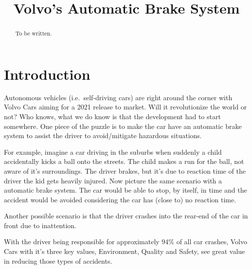 \documentclass[conference]{IEEEtran}
\begin{document}
\title{Volvo's Automatic Brake System}

\author{
\and
{}
}

\maketitle

\begin{abstract}
To be written.
\end{abstract}

\section{Introduction}
Autonomous vehicles (i.e.\ self-driving cars) are right around the corner with Volvo Cars aiming for a 2021 release to market.\cite{ADToMarket} Will it revolutionize the world or not? Who knows, what we do know is that the development had to start somewhere. One piece of the puzzle is to make the car have an automatic brake system to assist the driver to avoid/mitigate hazardous situations. 

For example, imagine a car driving in the suburbs when suddenly a child accidentally kicks a ball onto the streets. The child makes a run for the ball, not aware of it's surroundings. The driver brakes, but it's due to reaction time of the driver the kid gets heavily injured. Now picture the same scenario with a automatic brake system. The car would be able to stop, by itself, in time and the accident would be avoided considering the car has (close to) no reaction time.

Another possible scenario is that the driver crashes into the rear-end of the car in front due to inattention.

With the driver being responsible for approximately 94\% of all car crashes, Volvo Cars with it's three key values, Environment, Quality and Safety, see great value in reducing those types of accidents.\cite{CrashStats,VolvoValues}
\end{document}
